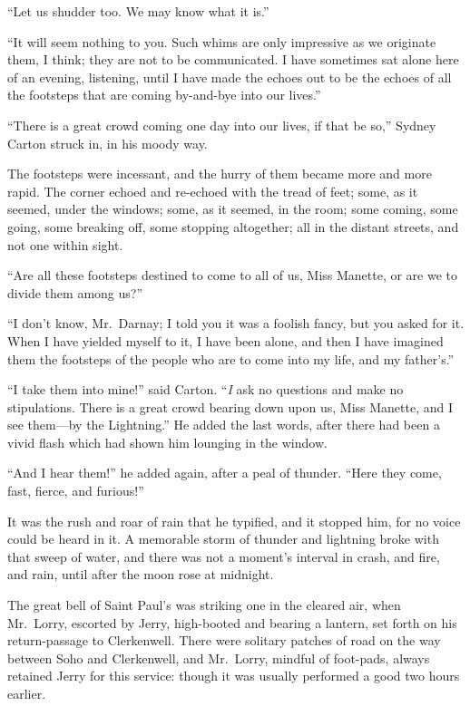 ``Let us shudder too.  We may know what it is.''

``It will seem nothing to you.  Such whims are only impressive as we
originate them, I think; they are not to be communicated.  I have
sometimes sat alone here of an evening, listening, until I have made
the echoes out to be the echoes of all the footsteps that are coming
by-and-bye into our lives.''

``There is a great crowd coming one day into our lives, if that be so,''
Sydney Carton struck in, in his moody way.

The footsteps were incessant, and the hurry of them became more and
more rapid.  The corner echoed and re-echoed with the tread of feet;
some, as it seemed, under the windows; some, as it seemed, in the room;
some coming, some going, some breaking off, some stopping altogether;
all in the distant streets, and not one within sight.

``Are all these footsteps destined to come to all of us, Miss Manette,
or are we to divide them among us?''

``I don't know, Mr.\ Darnay; I told you it was a foolish fancy, but you
asked for it.  When I have yielded myself to it, I have been alone,
and then I have imagined them the footsteps of the people who are to
come into my life, and my father's.''

``I take them into mine!'' said Carton.  ``\emph{I} ask no questions and make
no stipulations.  There is a great crowd bearing down upon us, Miss
Manette, and I see them---by the Lightning.''  He added the last words,
after there had been a vivid flash which had shown him lounging in
the window.

``And I hear them!'' he added again, after a peal of thunder.
``Here they come, fast, fierce, and furious!''

It was the rush and roar of rain that he typified, and it stopped him,
for no voice could be heard in it.  A memorable storm of thunder and
lightning broke with that sweep of water, and there was not a moment's
interval in crash, and fire, and rain, until after the moon rose at
midnight.

The great bell of Saint Paul's was striking one in the cleared air,
when Mr.\ Lorry, escorted by Jerry, high-booted and bearing a lantern,
set forth on his return-passage to Clerkenwell.  There were solitary
patches of road on the way between Soho and Clerkenwell, and Mr.\ Lorry,
mindful of foot-pads, always retained Jerry for this service:  though
it was usually performed a good two hours earlier.

